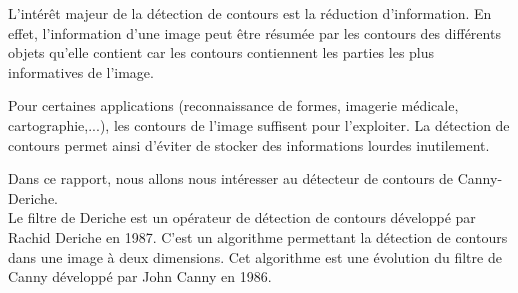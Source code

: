 L'intérêt majeur de la détection de contours est la réduction d'information. En effet, l'information d'une image peut être résumée par les contours des différents objets qu'elle contient car les contours contiennent les parties les plus informatives de l'image.

Pour certaines applications (reconnaissance de formes, imagerie médicale, cartographie,...), les contours de l'image suffisent pour l'exploiter. La détection de contours permet ainsi d'éviter de stocker des informations lourdes inutilement.

Dans ce rapport, nous allons nous intéresser au détecteur de contours de Canny-Deriche. \\

Le filtre de Deriche est un opérateur de détection de contours développé par Rachid Deriche en 1987. C'est un algorithme permettant la détection de contours dans une image à deux dimensions. Cet algorithme est une évolution du filtre de Canny développé par John Canny en 1986. 
